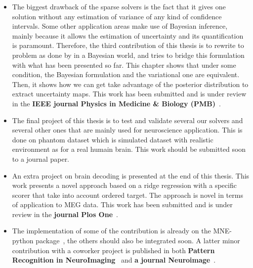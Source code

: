\begin{itemize}
\item The biggest drawback of the sparse solvers is the fact that it gives one solution without any estimation of variance of any kind of confidence intervals. Some other application areas make use of Bayesian inference, mainly because it allows the estimation of uncertainty and its quantification is paramount. Therefore, the third contribution of this thesis is to rewrite to problem as done by in a Bayesian world, and tries to bridge this formulation with what has been presented so far. This chapter shows that under some condition, the Bayesian formulation and the variational one are equivalent. Then, it shows how we can get take advantage of the posterior distribution to extract uncertainty maps. This work has been submitted and is under review in the \textbf{IEEE journal Physics in Medicine \& Biology (PMB)}~\cite{bekhti_arxiv_pmb}.

\item The final project of this thesis is to test and validate several our solvers and several other ones that are mainly used for neuroscience application. This is done on phantom dataset which is simulated dataset with realistic environment as for a real humain brain. This work should be submitted soon to a journal paper.

\item An extra project on brain decoding is presented at the end of this thesis. This work presents a novel approach based on a ridge regression with a specific scorer that take into account ordered target. The approach is novel in terms of application to MEG data. This work has been submitted and is under review in the \textbf{journal Plos One}~\cite{Bekhti_bioarxiv}.

\item The implementation of some of the contribution is already on the MNE-python package~\cite{MNE}, the others should also be integrated soon. A latter minor contribution with a coworker project is published in both \textbf{Pattern Recognition in NeuroImaging}~\cite{jas_autoreject_prni} and \textbf{a journal Neuroimage}~\cite{jas_neuroimage}.
\end{itemize}

